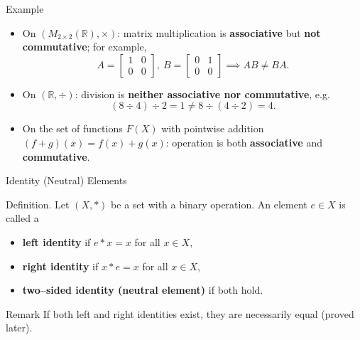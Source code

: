 \documentclass[11pt,aspectratio=43,ignorenonframetext,t]{beamer}
\newcounter{example_number} %
\begin{document}
\begin{frame}{Example}
\begin{block}{}
\begin{itemize}
  \item On \((M_{2\times2}(\mathbb{R}), \times)\): matrix multiplication is \textbf{associative} but \textbf{not commutative}; for example,
  \[
  A=\begin{bmatrix}1&0\\0&0\end{bmatrix},\ 
  B=\begin{bmatrix}0&1\\0&0\end{bmatrix} 
  \implies AB\neq BA.
  \]
  \item On \((\mathbb{R}, \div)\): division is \textbf{neither associative nor commutative}, e.g.
  \[
  (8\div4)\div2 = 1 \neq 8\div(4\div2)=4.
  \]
  \item On the set of functions \(F(X)\) with pointwise addition \((f+g)(x)=f(x)+g(x)\): operation is both \textbf{associative} and \textbf{commutative}.
\end{itemize}
\end{block}

\end{frame}

\begin{frame}{Identity (Neutral) Elements}
\begin{block}{Definition.}  
Let \((X,*)\) be a set with a binary operation.  
An element \(e \in X\) is called a
\begin{itemize}
  \item \textbf{left identity} if \( e * x = x \) for all \(x\in X\),
  \item \textbf{right identity} if \( x * e = x \) for all \(x\in X\),
  \item \textbf{two–sided identity (neutral element)} if both hold.
\end{itemize}
\end{block}


\begin{block}{Remark}
If both left and right identities exist, they are necessarily equal (proved later).
\end{block}

\end{frame}
\end{document}
